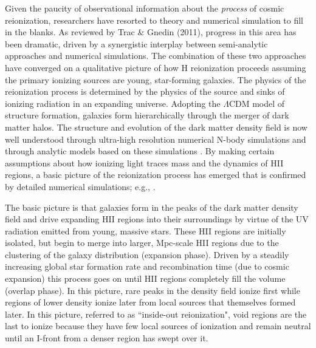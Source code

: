 Given the paucity of observational information about the {\em process} of cosmic reionization, researchers have resorted to theory and
numerical simulation to fill in the blanks. As reviewed by Trac \& Gnedin (2011), progress in this area has been dramatic, driven by a synergistic interplay between semi-analytic approaches and numerical simulations. The combination of these two approaches have converged on a qualitative picture of how H reionization proceeds assuming the primary ionizing sources are young, star-forming galaxies. The physics of the reionization process is determined by the physics of the source and sinks of ionizing radiation in an expanding universe. Adopting the $\Lambda$CDM model of structure formation, galaxies form hierarchically through the merger of dark matter halos. The structure and evolution of the dark matter density field is now well understood through ultra-high resolution numerical N-body simulations \citep{Millenium,Bolshoi} and through analytic models based on these simulations \citep{CooraySheth2002}. By making certain assumptions about how ionizing light traces mass and the dynamics of HII regions, a basic picture of the reionization process has emerged \citep {Furlanetto04,Furlanetto06,Iliev06,Zahn07} that is confirmed by detailed numerical simulations; e.g., \citep{Zahn11}.

The basic picture is that galaxies form in the peaks of the dark matter density field and drive expanding HII regions into their surroundings by
virtue of the UV radiation emitted from young, massive stars. These HII regions are initially isolated, but begin to merge into larger, Mpc-scale HII regions due to the clustering of the galaxy distribution (expansion phase). Driven by a steadily increasing global star formation rate and recombination time (due to cosmic expansion) this process goes on until HII regions completely fill the volume (overlap phase). In this picture, rare peaks in the density field ionize first while regions of lower density ionize later from local sources that themselves formed later. In this picture, referred to as ``inside-out reionization", void regions are the last to ionize because they have few local sources of ionization and remain neutral until an I-front from a denser region has swept over it. 

